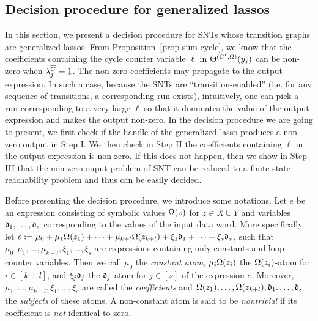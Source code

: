 
\vspace{-0.5cm}
\subsection{Decision procedure for generalized lassos}\label{sec-glasso}
\vspace{-1mm}
%
In this section, we present a decision procedure for SNTs whose transition graphs are generalized lassos. From Proposition~\ref{prop-sum-cycle}, we know that the coefficients containing the cycle counter variable $\ell$ in $\Theta^{(C^\ell,\Omega)}(y_j)$ can be non-zero when $\lambda^{\overline{C}}_{j}=1$. The non-zero coefficients may propagate to the output expression.  In such a case, 
because the SNTs are ``transition-enabled'' (i.e. for any sequence of transitions, a corresponding run exists), %
intuitively, one can pick a run corresponding to a very large $\ell$ so that it dominates the value of the output expression and makes the output non-zero. 
In the decision procedure we are going to present, we first check if the handle of the generalized lasso produces a non-zero output in Step I.
We then check in Step II the coefficients containing $\ell$ in the output expression is non-zero. If this does not happen, then we show in Step III that the non-zero ouput problem of SNT can be reduced to a finite state reachability problem and thus can be easily decided.

Before presenting the decision procedure, we introduce some notations.
Let $e$ be an expression consisting of symbolic values $\Omega(z)$ for $z\in X\cup Y$ and variables $\mathfrak{d}_1, \dots, \mathfrak{d}_{s}$ corresponding to the values of the input data word. More specifically, let $e:=\mu_0 + \mu_1 \Omega(z_1) +\dots + \mu_{k+l} \Omega(z_{k+l}) + \xi_1 \mathfrak{d}_1 + \dots + \xi_{s} \mathfrak{d}_{s}$,
such that $\mu_0,\mu_1,\dots,\mu_{k+l}, \xi_1,\dots,\xi_{s}$ are expressions containing only constants and loop counter variables.
Then we call $\mu_0$ the \emph{constant atom}, $\mu_i \Omega(z_i)$ the $\Omega(z_i)$-atom for $i\in[k+l]$, and $\xi_j \mathfrak{d}_j$ the $\mathfrak{d}_j$-atom for $j\in[s]$ of the expression $e$. Moreover, $\mu_1, \dots, \mu_{k+l}, \xi_1,\dots, \xi_{s}$ are called the \emph{coefficients} and $\Omega(z_1), \dots, \Omega(z_{k+l}), \mathfrak{d}_1. \dots, \mathfrak{d}_{s}$ the \emph{subjects} of these atoms.
A non-constant atom is said to be \emph{nontrivial} if its coefficient is \emph{not} identical to zero.

